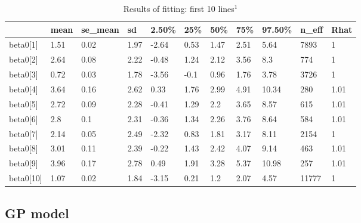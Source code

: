 \documentclass[a4paper]{artikel3}
\begin{document}
\begin{table}[!ht]
\centering
\caption{Results of fitting: first 10 lines$^1$}
\label{hier_results}
\begin{tabular}{lllllllllll}
\hline
              & mean & se\_mean & sd   & 2.50\% & 25\% & 50\% & 75\% & 97.50\% & n\_eff & Rhat \\ \hline
beta0{[}1{]}  & 1.51 & 0.02     & 1.97 & -2.64  & 0.53 & 1.47 & 2.51 & 5.64    & 7893   & 1    \\
beta0{[}2{]}  & 2.64 & 0.08     & 2.22 & -0.48  & 1.24 & 2.12 & 3.56 & 8.3     & 774    & 1    \\
beta0{[}3{]}  & 0.72 & 0.03     & 1.78 & -3.56  & -0.1 & 0.96 & 1.76 & 3.78    & 3726   & 1    \\
beta0{[}4{]}  & 3.64 & 0.16     & 2.62 & 0.33   & 1.76 & 2.99 & 4.91 & 10.34   & 280    & 1.01 \\
beta0{[}5{]}  & 2.72 & 0.09     & 2.28 & -0.41  & 1.29 & 2.2  & 3.65 & 8.57    & 615    & 1.01 \\
beta0{[}6{]}  & 2.8  & 0.1      & 2.31 & -0.36  & 1.34 & 2.26 & 3.76 & 8.64    & 584    & 1.01 \\
beta0{[}7{]}  & 2.14 & 0.05     & 2.49 & -2.32  & 0.83 & 1.81 & 3.17 & 8.11    & 2154   & 1    \\
beta0{[}8{]}  & 3.01 & 0.11     & 2.39 & -0.22  & 1.43 & 2.42 & 4.07 & 9.14    & 463    & 1.01 \\
beta0{[}9{]}  & 3.96 & 0.17     & 2.78 & 0.49   & 1.91 & 3.28 & 5.37 & 10.98   & 257    & 1.01 \\
beta0{[}10{]} & 1.07 & 0.02     & 1.84 & -3.15  & 0.21 & 1.2  & 2.07 & 4.57    & 11777  & 1    \\ \hline
\end{tabular}
\end{table}


\subsection{GP model}
\end{document}
